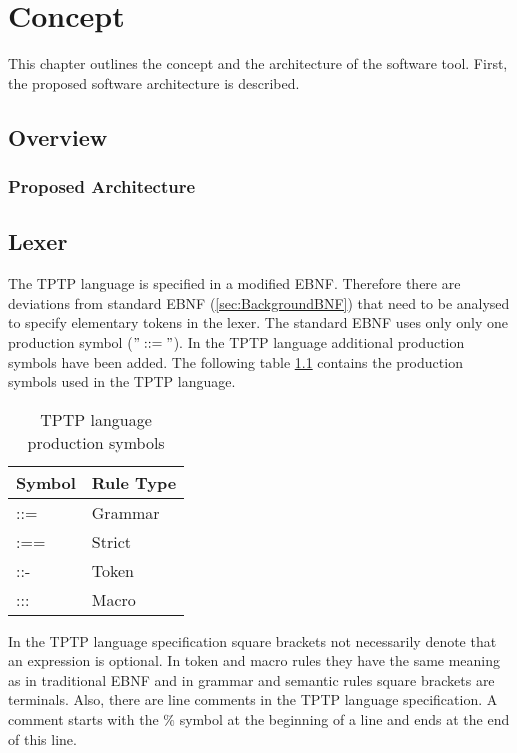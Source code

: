 
\chapter{Concept}\label{cha:Concept}
This chapter outlines the concept and the architecture of the software tool. First, the proposed software architecture is described.



\section{Overview}\label{sec:ConceptOverview}

\subsection{Proposed Architecture}\label{sec:ConceptProposedArchitecture}

\section{Lexer}
The \ac{TPTP} language is specified in a modified \ac{EBNF}.
Therefore there are deviations from standard \ac{EBNF} (\ref{sec:BackgroundBNF}) that need to be analysed to specify elementary tokens in the lexer.
The standard \ac{EBNF} uses only only one production symbol ($"::="$).
In the \ac{TPTP} language
additional production symbols have been added. The following table \ref{tbl:ConceptTPTPProductionSymbols} contains the production symbols used in the \ac{TPTP} language.

\begin{table}[H]
\centering
\renewcommand{\arraystretch}{1}
\caption{\ac{TPTP} language production symbols \cite{VS06}}
\begin{tabular}{ll}
\textbf{Symbol} & \textbf{Rule Type}\\\hline
::= & Grammar\\
:== & Strict\\
::- & Token\\
::: & Macro\\
\end{tabular}
\label{tbl:ConceptTPTPProductionSymbols}
\end{table}

In the \ac{TPTP} language specification square brackets not necessarily denote that an expression is optional.
In token and macro rules they have the same meaning as in traditional  \ac{EBNF} and in grammar and semantic rules square brackets are terminals.
Also, there are line comments in the \ac{TPTP} language specification. A comment starts with the $\%$ symbol at the beginning of a line and ends at the end of this line.

